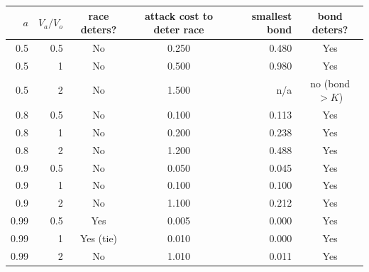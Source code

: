 \begin{tabular}{|r|r|c|c|r|c|}
\hline
\rowcolor{gray!15}$a$ & $V_a/V_o$ & race deters? & attack cost to deter race & smallest bond & bond deters? \\
\hline
0.5 & 0.5 & No & 0.250 & 0.480 & Yes \\
\hline
0.5 & 1 & No & 0.500 & 0.980 & Yes \\
\hline
0.5 & 2 & No & 1.500 & n/a & no (bond $>K$) \\
\hline
0.8 & 0.5 & No & 0.100 & 0.113 & Yes \\
\hline
0.8 & 1 & No & 0.200 & 0.238 & Yes \\
\hline
0.8 & 2 & No & 1.200 & 0.488 & Yes \\
\hline
0.9 & 0.5 & No & 0.050 & 0.045 & Yes \\
\hline
0.9 & 1 & No & 0.100 & 0.100 & Yes \\
\hline
0.9 & 2 & No & 1.100 & 0.212 & Yes \\
\hline
0.99 & 0.5 & Yes & 0.005 & 0.000 & Yes \\
\hline
0.99 & 1 & Yes (tie) & 0.010 & 0.000 & Yes \\
\hline
0.99 & 2 & No & 1.010 & 0.011 & Yes \\
\hline
\end{tabular}
